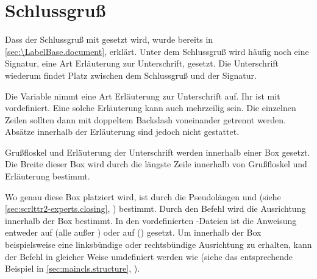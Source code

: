 \section{Schlussgruß}
\BeginIndexGroup
{}

Dass der Schlussgruß mit 
gesetzt wird, wurde bereits in \autoref{sec:\LabelBase.document},
 erklärt. Unter dem Schlussgruß wird häufig
noch eine Signatur, eine Art Erläuterung zur Unterschrift, gesetzt. Die
Unterschrift wiederum findet Platz zwischen dem Schlussgruß und der Signatur.

\begin{Declaration}
\end{Declaration}
Die Variable  nimmt eine Art Erläuterung
zur Unterschrift auf. Ihr  ist mit
 vordefiniert. Eine
solche Erläuterung kann auch mehrzeilig sein. Die einzelnen Zeilen sollten
dann mit doppeltem Backslash voneinander getrennt
werden. Absätze innerhalb der Erläuterung sind jedoch nicht
gestattet.%
%
\EndIndexGroup


\begin{Declaration}
\end{Declaration}
Grußfloskel und Erläuterung der
Unterschrift werden innerhalb einer Box gesetzt.  Die
Breite dieser Box wird durch die längste Zeile innerhalb von Grußfloskel und
Erläuterung bestimmt.

Wo genau diese Box platziert wird, ist durch die Pseudolängen
 und
 (siehe
\autoref{sec:scrlttr2-experts.closing},
) bestimmt.  Durch den Befehl
 wird die Ausrichtung innerhalb der Box bestimmt. In
den vordefinierten -Dateien ist die Anweisung entweder auf
 (alle außer ) oder auf 
() gesetzt. Um innerhalb der Box beispielsweise eine
linksbündige oder rechtsbündige Ausrichtung zu erhalten, kann der Befehl in
gleicher Weise umdefiniert werden wie 
(siehe das entsprechende Beispiel in \autoref{sec:maincls.structure},
).

